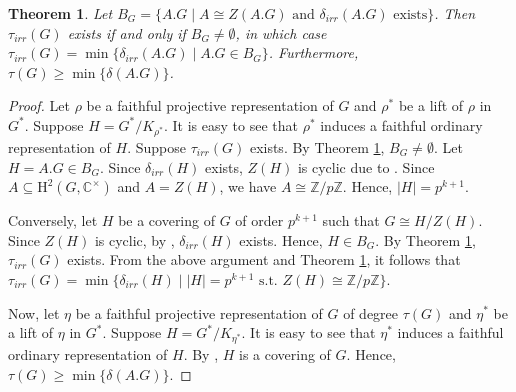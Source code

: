 \documentclass[a4paper,11pt]{amsart}
\numberwithin{equation}{section}
\numberwithin{equation}{subsection}
\newtheorem{theorem}{Theorem}[section]
\newcommand{\C}{\mathbb{C}}
\newcommand{\Z}{\mathbb{Z}}
\begin{document}
\begin{theorem} 
\label{projective embedding degrees}
Let $B_G= \{A.G \mid A \cong Z(A.G) \text{ and } \delta_{irr}(A.G) \text{ exists} \}$. Then $\tau_{irr}(G)$ exists if and only if $B_G \neq \emptyset$, in which case $\tau_{irr}(G) = \min\{\delta_{irr}(A.G) \mid A.G \in B_G\}$. 
Furthermore, $\tau(G) \geq \min\{\delta(A.G) \} $.
\end{theorem}

\begin{proof}
Let $\rho$ be a faithful projective representation of $G$ and $\rho^*$ be a lift of $\rho$ in $G^*$. Suppose $H= G^*/K_{\rho^*}$. It is easy to see that $\rho^*$ induces a faithful ordinary representation of $H$.
Suppose $\tau_{irr}(G)$ exists. By Theorem \ref{projective embedding degrees}, $B_G \neq \emptyset$. Let $H= A.G \in B_G$. Since $\delta_{irr}(H)$ exists, $Z(H)$ is cyclic due to \cite[Theorem 2.32(a)]{isaacs}. Since $A \subseteq \mathrm{H}^2(G, \C^{\times})$ and $A = Z(H)$, we have $A \cong \Z/p\Z$. Hence, $|H|= p^{k+1}$.

Conversely, let $H$ be a covering of $G$ of order $p^{k+1}$ such that $G \cong H/Z(H)$. Since $Z(H)$ is cyclic, by \cite[Theorem 2.32(b)]{isaacs}, $\delta_{irr}(H)$ exists. Hence, $H \in B_G$. By Theorem \ref{projective embedding degrees}, $\tau_{irr}(G)$ exists.
From the above argument and Theorem \ref{projective embedding degrees}, it follows that $\tau_{irr}(G) = \min\{\delta_{irr}(H) \mid |H|= p^{k+1} \text{ s.t. } Z(H) \cong \Z/p\Z \}$. 

Now, let $\eta$ be a faithful projective representation of $G$ of degree $\tau(G)$ and $\eta^*$ be a lift of $\eta$ in $G^*$. Suppose $H= G^*/K_{\eta^*}$. It is easy to see that $\eta^*$ induces a faithful ordinary representation of $H$. By \cite[Proposition 2.15]{gonzalo}, $H$ is a covering of $G$. Hence, $\tau(G) \geq \min\{\delta(A.G) \}$. 

\end{proof}
\end{document}
